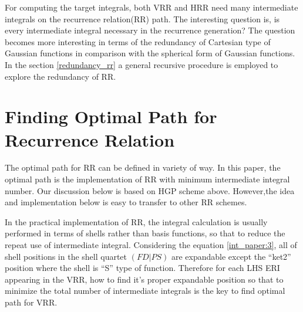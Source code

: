 For computing the target integrals, both VRR and HRR need many intermediate integrals on
the recurrence relation(RR) path. The interesting question is, is every intermediate integral 
necessary in the recurrence generation? The question becomes more interesting in terms of 
the redundancy of Cartesian type of Gaussian functions in comparison with the spherical form of 
Gaussian functions. In the section \ref{redundancy_rr} a general recursive procedure is 
employed to explore the redundancy of RR.


\section{Finding Optimal Path for Recurrence Relation}
\label{optimal_path}

The optimal path for RR can be defined in variety of way. In this paper,
the optimal path is the implementation of RR with minimum intermediate integral
number. Our discussion below is based on HGP scheme above. However,the idea 
and implementation below is easy to transfer to other RR schemes.

In the practical implementation of RR, the integral calculation is usually performed 
in terms of shells rather than basis functions, so that to reduce the repeat use of 
intermediate integral. Considering the equation \ref{int_paper:3}, 
all of shell positions in the shell quartet $(FD|PS)$ are expandable except the ``ket2'' position 
where the shell is ``S'' type of 
function. Therefore for each LHS ERI appearing in the VRR, how to find it's proper expandable
position so that to minimize the total number of intermediate integrals is the key to 
find optimal path for VRR.

